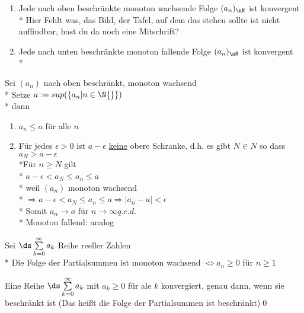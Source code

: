 \begin{enumerate}
\item{Jede nach oben beschränkte monoton wachsende Folge $(a_n)_{\nN}$ ist konvergent\\*
Hier Fehlt was, das Bild, der Tafel, auf dem das stehen sollte ist nicht auffindbar, hast du da noch eine Mitschrift?
}
\item{Jede nach unten beschränkte monoton fallende Folge $(a_n)_\nN$ ist konvergent\\*
}
\end{enumerate}
\bew
Sei $(a_n)$ nach oben beschränkt, monoton wachsend\\*
Setze $a:= sup(\{a_n | n \in \N{}\})$\\*
dann \begin{enumerate}
\item{$a_n \leq a$ für alle $n$}
\item{Für jedes $\epsilon > 0$ ist $a - \epsilon$ \ul{keine} obere Schranke, d.h. es gibt $N \in N$ so dass $a_N > a - \epsilon$
\\*Für $n \geq N$ gilt\\*
$a - \epsilon < a_N \leq a_n \leq a$\\*
weil $(a_n)$ monoton wachsend\\*
$\Rightarrow a - \epsilon < a_N \leq a_n \leq a \Rightarrow |a_n -a| < \epsilon$\\*
Somit $a_n \to a$ für $n \to \infty$\phantom{XXX}$q.e.d.$\\*
Monoton fallend: analog}
\end{enumerate}

\bem
Sei $\ds\sum\limits_{k=0}^{\infty} a_k$ Reihe reeller Zahlen\\*
Die Folge der Partialsummen ist monoton wachsend $\Leftrightarrow a_n \geq 0$ für $n \geq 1$

Eine Reihe $\ds\sum\limits_{k=0}^{\infty} a_k$ mit $a_k \geq 0$ für ale $k$ konvergiert, genau dann, wenn sie beschränkt ist (Das heißt die Folge der Partialsummen ist beschränkt)\qed

